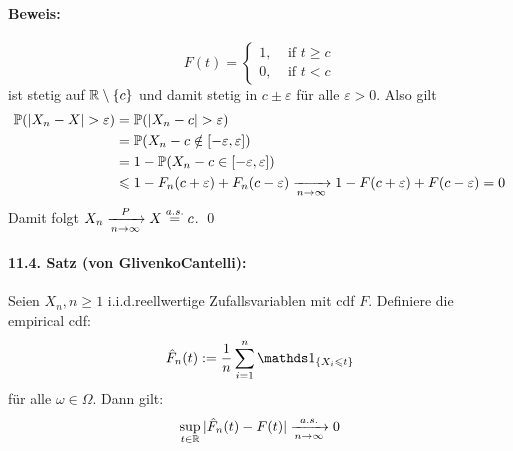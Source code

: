 \documentclass[11pt]{report}
\begin{document}
\paragraph{Beweis:} 
\begin{equation*}F(t)=
	\begin{cases}
	   1, \ \ \ \ \ \text{if }t\geq  c\\
	   0, \ \ \ \ \ \text{if }t<  c
	\end{cases}
\end{equation*}
ist stetig auf $\mathbb{R} \setminus\{c\}$ und damit stetig in $c\pm\varepsilon$ f\"ur alle $\varepsilon>0$. Also gilt
\begin{align*}
    \Pp(|X_n-X|>\varepsilon)&=\Pp(|X_n-c|>\varepsilon)\\
    &=\Pp(X_n-c\notin[-\varepsilon,\varepsilon]) \\
	&=1-\Pp(X_n-c\in[-\varepsilon,\varepsilon]) \\
	&\leq1-F_n(c+\varepsilon)+F_n(c-\varepsilon) \nto{}{n\to\infty}1-F(c+\varepsilon)+F(c-\varepsilon)=0
\end{align*}
Damit folgt $X_n\nto{P}{n\to\infty}X\overset{a.s.}{=}c$. \qed


\paragraph{11.4. Satz (von Glivenko\textendash Cantelli):} Seien $X_n, n\geq 1$ i.i.d.reellwertige Zufallsvariablen mit cdf $F$. Definiere die empirical cdf:
    $$\hat{F}_n(t):=\dfrac{1}{n}\sum_{i=1}^n\ind{\{X_i\leq t\}}$$
f\"ur alle $\omega\in\Omega$. Dann gilt:
	$$\sup_{t\in\R}|\hat{F}_n(t)-F(t)|\nto{a.s.}{n\to\infty}0$$
\end{document}
